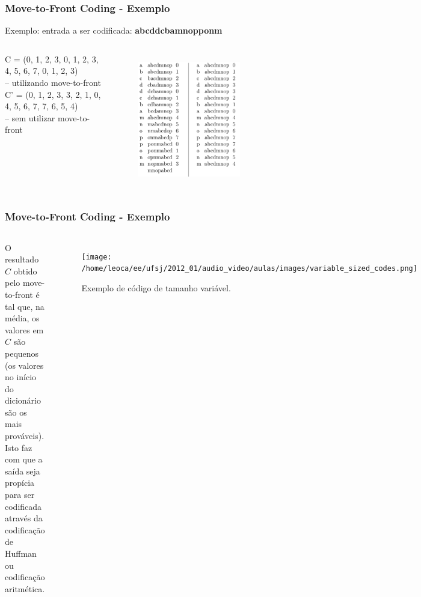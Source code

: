 \begin{frame}%
  \frametitle{Move-to-Front Coding - Exemplo \citep{salomon2010}}

   Exemplo:
   entrada a ser codificada: \textbf{abcddcbamnopponm}

  \begin{columns}[c]
  C = (0, 1, 2, 3, 0, 1, 2, 3, 4, 5, 6, 7, 0, 1, 2, 3) \\
  -- utilizando move-to-front\\
  \vspace{1cm}
  C' = (0, 1, 2, 3, 3, 2, 1, 0, 4, 5, 6, 7, 7, 6, 5, 4) \\
  -- sem utilizar move-to-front 
     \vspace{-0.2cm}
     \begin{figure}[h!]
     \centering
     \includegraphics[width=0.7\textwidth]{images/move_to_front_coding.png}
     \label{fig:move_to_front_coding}
     \end{figure}
  \end{columns}

\end{frame} 

\begin{frame}%
  \frametitle{Move-to-Front Coding - Exemplo \citep{salomon2010}}
  \begin{columns}[c]
  O resultado $C$ obtido pelo move-to-front é tal que, na média, os valores
  em $C$ são pequenos (os valores no início do dicionário são os mais prováveis).
  Isto faz com que a saída seja propícia para ser codificada através da codificação
  de Huffman ou codificação aritmética.
     \begin{figure}[h!]
     \centering
     \texttt{[image: /home/leoca/ee/ufsj/2012\_01/audio\_video/aulas/images/variable\_sized\_codes.png]}
     \caption{Exemplo de código de tamanho variável.}
     \label{fig:variable_sized_codes}
     \end{figure}
  \end{columns}

\end{frame}


